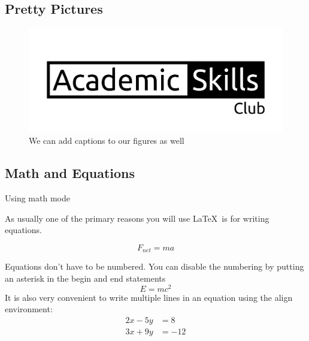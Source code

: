 \documentclass[xcolor={dvipsnames}]{beamer}
\begin{document}
\subsection{Pretty Pictures}
\begin{frame}

\begin{figure}[h]
\begin{center}
\includegraphics[scale=1.5]{logo.png}
\end{center}
\caption{We can add captions to our figures as well}
\end{figure}

\end{frame}

\subsection{Math and Equations}
\begin{frame}{Using math mode}

As usually one of the primary reasons you will use \LaTeX \ is for writing equations.  

\begin{equation}
F_{net}=ma
\end{equation}

Equations don't have to be numbered. You can disable the numbering by putting 
an asterisk in the begin and end statements 
\begin{equation*}
E=mc^{2}
\end{equation*}
It is also very convenient to write multiple lines in an equation using 
the align environment:
\begin{align*}
2x - 5y &=  8 \\ 
3x + 9y &=  -12
\end{align*}
\end{frame}
\end{document}
